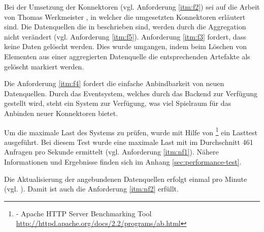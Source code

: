 Bei der Umsetzung der Konnektoren (vgl. Anforderung \ref{itm:f2}) sei auf die Arbeit von Thomas Werkmeister \cite{bp-tewe}, in welcher die umgesetzten Konnektoren erläutert sind. Die Datenquellen die in \cite{bp-tewe} beschrieben sind, werden durch die Aggregation nicht verändert (vgl. Anforderung \ref{itm:f5}). Anforderung \ref{itm:f3} fordert, dass keine Daten gelöscht werden. Dies wurde umgangen, indem beim Löschen von Elementen aus einer aggregierten Datenquelle die entsprechenden Artefakte als gelöscht markiert werden.

Die Anforderung \ref{itm:f4} fordert die einfache Anbindbarkeit von neuen Datenquellen. Durch das Eventsystem, welches durch das Backend zur Verfügung gestellt wird, steht ein System zur Verfügung, was viel Spielraum für das Anbinden neuer Konnektoren bietet.

Um die maximale Last des Systems zu prüfen, wurde mit Hilfe von \footnote{ - Apache HTTP Server Benchmarking Tool \url{http://httpd.apache.org/docs/2.2/programs/ab.html}} ein Lasttest ausgeführt. Bei diesem Test wurde eine maximale Last mit im Durchschnitt 461 Anfragen pro Sekunde ermittelt (vgl. Anforderung \ref{itm:nf1}). Nähere Informationen und Ergebnisse finden sich im Anhang \ref{sec:performance-test}.

Die Aktualisierung der angebundenen Datenquellen erfolgt einmal pro Minute (vgl. \cite{bp-tewe}). Damit ist auch die Anforderung \ref{itm:nf2} erfüllt.
